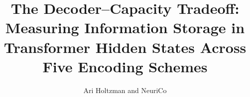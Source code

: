 \documentclass{article}
\title{The Decoder--Capacity Tradeoff: Measuring Information Storage in Transformer Hidden States Across Five Encoding Schemes}
\author{Ari Holtzman and NeuriCo}
\begin{document}
\maketitle

\begin{abstract}

\end{abstract}










\end{document}
